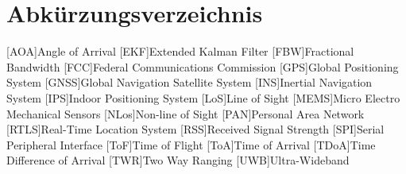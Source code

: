 \chapter*{Abkürzungsverzeichnis}
\begin{acronym}
		
	[AOA]{Angle of Arrival}
	[EKF]{Extended Kalman Filter}
	[FBW]{Fractional Bandwidth}
	[FCC]{Federal Communications Commission}
	[GPS]{Global Positioning System}
	[GNSS]{Global Navigation Satellite System}
	[INS]{Inertial Navigation System}
	[IPS]{Indoor Positioning System}
	[LoS]{Line of Sight}
	[MEMS]{Micro Electro Mechanical Sensors}
	[NLos]{Non-line of Sight}
	[PAN]{Personal Area Network}
	[RTLS]{Real-Time Location System}
	[RSS]{Received Signal Strength}
	[SPI]{Serial Peripheral Interface}
	[ToF]{Time of Flight}
	[ToA]{Time of Arrival}
	[TDoA]{Time Difference of Arrival}
	[TWR]{Two Way Ranging}
	[UWB]{Ultra-Wideband} %

\end{acronym}